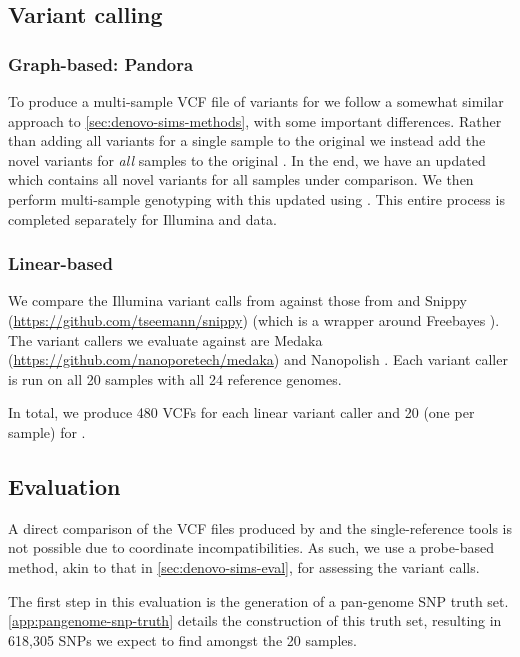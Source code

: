 \subsection{Variant calling}

\subsubsection{Graph-based: Pandora}
To produce a multi-sample VCF file of variants for \pandora{} we follow a somewhat similar approach to \autoref{sec:denovo-sims-methods}, with some important differences. Rather than adding all \denovo{} variants for a single sample to the original \panrg{} we instead add the novel variants for \emph{all} samples to the original \panrg{}. In the end, we have an updated \panrg{} which contains all novel variants for all samples under comparison. We then perform multi-sample genotyping with this updated \panrg{} using \compare{}. This entire process is completed separately for Illumina and \ont{} data.

\subsubsection{Linear-based}
We compare the Illumina variant calls from \pandora{} against those from  \cite{samtools2009} and Snippy (\url{https://github.com/tseemann/snippy}) (which is a wrapper around Freebayes \cite{Garrison2012}). The \ont{} variant callers we evaluate against are Medaka (\url{https://github.com/nanoporetech/medaka}) and Nanopolish \cite{Loman2015}. Each variant caller is run on all 20 samples with all 24 reference genomes. 

\noindent
In total, we produce 480 VCFs for each linear variant caller and 20 (one per sample) for \pandora{}.

\subsection{Evaluation}
\label{sec:denovo-empirical-eval}

A direct comparison of the VCF files produced by \pandora{} and the single-reference tools is not possible due to coordinate incompatibilities. As such, we use a probe-based method, akin to that in \autoref{sec:denovo-sims-eval}, for assessing the variant calls. 

The first step in this evaluation is the generation of a pan-genome SNP truth set. \autoref{app:pangenome-snp-truth} details the construction of this truth set, resulting in 618,305 SNPs we expect to find amongst the 20 samples.

